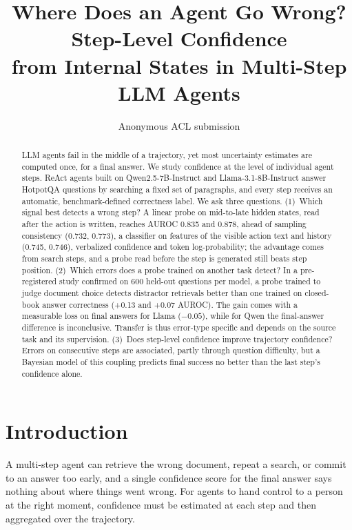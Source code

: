 \documentclass[11pt]{article}
\title{Where Does an Agent Go Wrong? Step-Level Confidence\\from Internal States in Multi-Step LLM Agents}
\author{Anonymous ACL submission}
\begin{document}
\maketitle

\begin{abstract}
LLM agents fail in the middle of a trajectory, yet most uncertainty estimates are computed once, for a final answer.
We study confidence at the level of individual agent steps. ReAct agents built on Qwen2.5-7B-Instruct and
Llama-3.1-8B-Instruct answer HotpotQA questions by searching a fixed set of paragraphs, and every step receives an
automatic, benchmark-defined correctness label. We ask three questions. (1)~Which signal best detects a wrong step? A linear probe on
mid-to-late hidden states, read after the action is written, reaches AUROC 0.835 and 0.878, ahead of sampling
consistency (0.732, 0.773), a classifier on features of the visible action text and history (0.745, 0.746),
verbalized confidence and token log-probability; the advantage comes from search steps, and a probe read before the
step is generated still beats step position. (2)~Which errors does a probe trained on another task detect? In a
pre-registered study confirmed on 600 held-out questions per model, a probe trained to judge document choice
detects distractor retrievals better than one trained on closed-book answer correctness (+0.13 and +0.07 AUROC).
The gain comes with a measurable loss on final answers for Llama ($-0.05$), while for Qwen the final-answer
difference is inconclusive. Transfer is thus error-type specific and depends on the source task and its
supervision. (3)~Does step-level confidence improve trajectory confidence? Errors on consecutive steps are
associated, partly through question difficulty, but a Bayesian model of this coupling predicts final success no
better than the last step's confidence alone.
\end{abstract}

\section{Introduction}
A multi-step agent can retrieve the wrong document, repeat a search, or commit to an answer too early, and a single
confidence score for the final answer says nothing about where things went wrong. For agents to hand control to a
person at the right moment, confidence must be estimated at each step and then aggregated over the trajectory.
\end{document}
